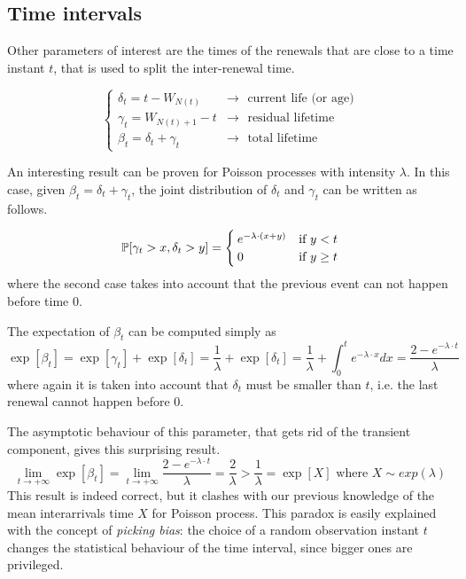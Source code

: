 \subsection{Time intervals}
	Other parameters of interest are the times of the renewals that are close to a time instant $t$, that is used to split the inter-renewal time.

	\begin{equation} \begin{cases}
		\delta_t = t - W_{N(t)} & \rightarrow
			\text{~~current life (or age)} \\
		\gamma_t = W_{N(t)+1}-t & \rightarrow
			\text{~~residual lifetime} \\
		\beta_t = \delta_t + \gamma_t & \rightarrow
			\text{~~total lifetime}
	\end{cases} \end{equation}

	\bigbreak
	An interesting result can be proven for Poisson processes with intensity $\lambda$.
	In this case, given $\beta_t = \delta_t + \gamma_t$, the joint distribution of $\delta_t$ and $\gamma_t$ can be written as follows.

	\begin{equation}
		\mathbb{P}[\gamma_t > x, \delta_t > y ] =
		\begin{cases}
			e^{-\lambda \cdot (x+y)} & \text{if } y < t \\
			0 & \text{if } y \ge t \\
		\end{cases}
	\end{equation}
	where the second case takes into account that the previous event can not happen before time 0.

	The expectation of $\beta_t$ can be computed simply as
	\begin{equation*}
		\exp[\beta_t] = \exp[\gamma_t] + \exp[\delta_t] =
		\frac{1}{\lambda} + \exp[\delta_t] =
		\frac{1}{\lambda} + \int_0^t e^{-\lambda \cdot x} dx =
		\frac{2-e^{-\lambda \cdot t}}{\lambda}
	\end{equation*}
	where again it is taken into account that $\delta_t$ must be smaller than $t$, i.e. the last renewal cannot happen before 0.

	The asymptotic behaviour of this parameter, that gets rid of the transient component, gives this surprising result.
	\begin{equation*}
		\lim_{t \to +\infty} \exp[\beta_t] = \lim_{t \to +\infty} \frac{2-e^{-\lambda \cdot t}}{\lambda} = \frac{2}{\lambda} > \frac{1}{\lambda} = \exp[X] \text{ where } X \sim exp(\lambda)
	\end{equation*}
	This result is indeed correct, but it clashes with our previous knowledge of the mean interarrivals time $X$ for Poisson process.
	This paradox is easily explained with the concept of \emph{picking bias}: the choice of a random observation instant $t$ changes the statistical behaviour of the time interval, since bigger ones are privileged.

